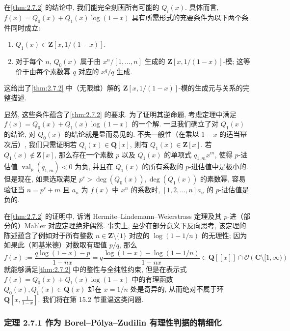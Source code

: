 \begin{remark}[Remark 2.7.5]\label{rem:2.7.5}
在\autoref{thm:2.7.2} 的结论中, 我们能完全刻画所有可能的 \(Q_i(x)\). 
具体而言, \(f(x) = Q_0(x) + Q_1(x) \log(1-x)\) 具有所需形式的充要条件为以下两个条件同时成立:
\begin{enumerate}
  \item[(1)] \(Q_1(x) \in \mathbf{Z}[x, 1/(1-x)]\).
  \item[(2)] 对于每个 \(n\), \(Q_0(x)\) 属于由 \(x^n/[1, \dots, n]\) 生成的 \(\mathbf{Z}[x, 1/(1-x)]\)-模; 这等价于由每个素数幂 \(q\) 对应的 \(x^q/q\) 生成.
\end{enumerate}
这给出了\autoref{thm:2.7.2} 中（无限维）解的 \(\mathbf{Z}[x, 1/(1-x)]\)-模的生成元与关系的完整描述.

显然, 这些条件蕴含了\autoref{thm:2.7.2} 的要求. 
为了证明其逆命题, 考虑定理中满足 \(f(x) = Q_0(x) + Q_1(x) \log(1-x)\) 的一个解. 
一旦我们确立了对 \(Q_1(x)\) 的结论, 对 \(Q_0(x)\) 的结论就是显而易见的. 
不失一般性（在乘以 \(1-x\) 的适当幂次后）, 我们只需证明若 \(Q_i(x) \in \mathbf{Q}[x]\), 则有 \(Q_1(x) \in \mathbf{Z}[x]\). 
若 \(Q_1(x) \notin \mathbf{Z}[x]\), 那么存在一个素数 \(p\) 以及 \(Q_1(x)\) 的单项式 \(q_{1,m}x^m\), 使得 \(p\)-进估值 \(\operatorname{val}_p(q_{1,m}) < 0\) 为负, 并且在 \(Q_1(x)\) 的所有系数的 \(p\)-进估值中是极小的. 
但是现在, 如果选取满足 \(p^r > \deg(Q_0(x)), \deg(Q_1(x))\) 的素数幂, 容易验证当 \(n = p^r + m\) 且 \(a_n\) 为 \(f(x)\) 中 \(x^n\) 的系数时, \([1, 2, \ldots, n]a_n\) 的 \(p\)-进估值是负的.
\end{remark}

\begin{remark}[Remark 2.7.6]\label{rem:2.7.6}
在\autoref{thm:2.7.2} 的证明中, 诉诸 Hermite--Lindemann--Weierstrass 定理及其 \(p\)-进（部分的）Mahler 对应定理绝非偶然. 
事实上, 至少在部分意义下反向思考, 该定理的陈述蕴含了例如对于所有整数 \(n \in \mathbf{Z} \setminus \{1\}\) 对应的 \(\log(1-1/n)\) 的无理性; 
因为如果此（阿基米德）对数取有理值 \(p/q\), 那么
\[ f(x) := \frac{q \log(1-x) - p}{1-nx} = q \frac{\log(1-x) - \log(1-1/n)}{1-nx} \in \mathbf{Q}[\! [x]\! ] \cap \mathcal{O}\left(\mathbf{C} \setminus [1,\infty)\right) \]
就能够满足\autoref{thm:2.7.2} 中的整性与全纯性约束, 
但是在表示式 \(f(x) = Q_0(x) + Q_1(x) \log(1-x)\) 中的有理函数 \(Q_0(x), Q_1(x) \in \mathbf{Q}(x)\) 却在 \(x = 1/n\) 处是奇异的, 从而绝对不属于环 \(\mathbf{Q}\left[x, \frac{1}{1-x}\right]\). 
我们将在第 15.2 节重温这类问题.
\end{remark}

\subsubsection{定理 2.7.1 作为 Borel--Pólya--Zudilin 有理性判据的精细化}\label{sec:2.7.7}


